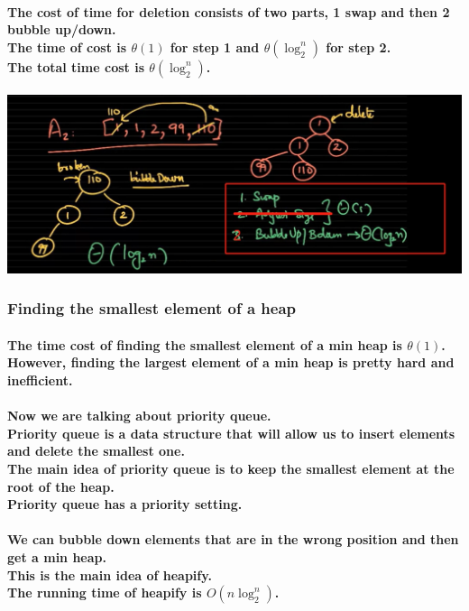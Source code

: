 \documentclass{article}
\begin{document}
\paragraph{The cost of time for deletion consists of two parts, 1 swap and then 2 bubble up/down.\\
The time of cost is $\theta(1)$ for step 1 and $\theta(\log_2^n)$ for step 2.\\
The total time cost is $\theta(\log_2^n)$.\\}


\includegraphics[width=\textwidth]{deletiontimecost.png}



\subsubsection{Finding the smallest element of a heap}

\paragraph{The time cost of finding the smallest element of a min heap is $\theta(1)$.\\
However, finding the largest element of a min heap is pretty hard and inefficient.\\}

\paragraph{Now we are talking about priority queue.\\
Priority queue is a data structure that will allow us to insert elements and delete the smallest one.\\
The main idea of priority queue is to keep the smallest element at the root of the heap.\\
Priority queue has a priority setting.\\}

\paragraph{We can bubble down elements that are in the wrong position and then get a min heap.\\
This is the main idea of heapify.\\
The running time of heapify is $O(n\log_2^n)$.\\}
\end{document}
